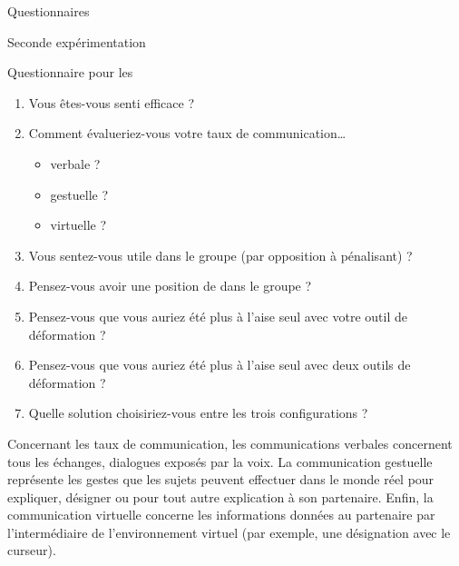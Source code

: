 \documentclass[myfrancais]{mythesis}
\begin{document}
\begin{mychapter}{Questionnaires}
\begin{mysection}{Seconde expérimentation}
\begin{mysubsection}{Questionnaire pour les }
				\begin{enumerate}
					\item Vous êtes-vous senti efficace ?
					\item Comment évalueriez-vous votre taux de communication\dots{}
						\begin{itemize}
							\item verbale ?
							\item gestuelle ?
							\item virtuelle ?
						\end{itemize}
					\item Vous sentez-vous utile dans le groupe (par opposition à pénalisant) ?
					\item Pensez-vous avoir une position de  dans le groupe ?
					\item Pensez-vous que vous auriez été plus à l'aise seul avec votre outil de déformation ?
					\item Pensez-vous que vous auriez été plus à l'aise seul avec deux outils de déformation ?
					\item Quelle solution choisiriez-vous entre les trois configurations ?
				\end{enumerate}

				Concernant les taux de communication, les communications verbales concernent tous les échanges, dialogues exposés par la voix.
				La communication gestuelle représente les gestes que les sujets peuvent effectuer dans le monde réel pour expliquer, désigner ou pour tout autre explication à son partenaire.
				Enfin, la communication virtuelle concerne les informations données au partenaire par l'intermédiaire de l'environnement virtuel (par exemple, une désignation avec le curseur).
			\end{mysubsection}
		\end{mysection}
	\end{mychapter}
\end{document}

